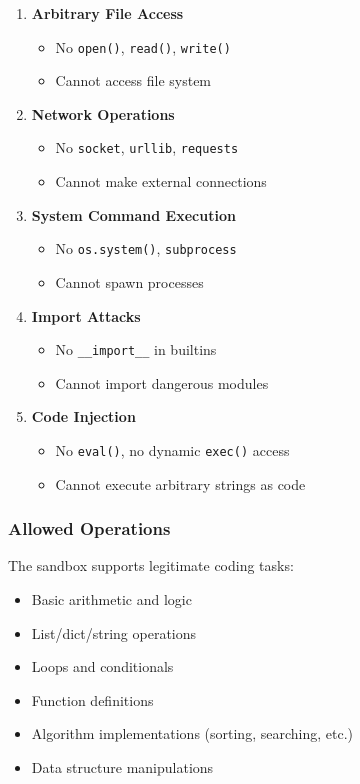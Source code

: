 \documentclass[12pt,a4paper]{article}
\begin{document}
\begin{enumerate}
    \item \textbf{Arbitrary File Access}
    \begin{itemize}
        \item No \texttt{open()}, \texttt{read()}, \texttt{write()}
        \item Cannot access file system
    \end{itemize}
    
    \item \textbf{Network Operations}
    \begin{itemize}
        \item No \texttt{socket}, \texttt{urllib}, \texttt{requests}
        \item Cannot make external connections
    \end{itemize}
    
    \item \textbf{System Command Execution}
    \begin{itemize}
        \item No \texttt{os.system()}, \texttt{subprocess}
        \item Cannot spawn processes
    \end{itemize}
    
    \item \textbf{Import Attacks}
    \begin{itemize}
        \item No \texttt{\_\_import\_\_} in builtins
        \item Cannot import dangerous modules
    \end{itemize}
    
    \item \textbf{Code Injection}
    \begin{itemize}
        \item No \texttt{eval()}, no dynamic \texttt{exec()} access
        \item Cannot execute arbitrary strings as code
    \end{itemize}
\end{enumerate}

\subsubsection{Allowed Operations}
The sandbox supports legitimate coding tasks:

\begin{itemize}
    \item Basic arithmetic and logic
    \item List/dict/string operations
    \item Loops and conditionals
    \item Function definitions
    \item Algorithm implementations (sorting, searching, etc.)
    \item Data structure manipulations
\end{itemize}
\end{document}
